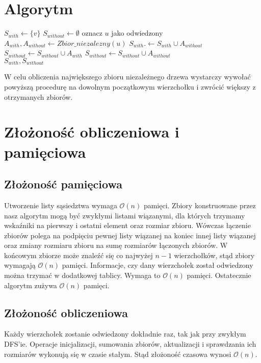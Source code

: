 \documentclass{article}
\begin{document}
\section{Algorytm}
\begin{algorithm}
\caption{$Zbior\_niezalezny(v)$}
\begin{algorithmic}[1]
\State $S_{with} \leftarrow \{ v \}$
\State $S_{without} \leftarrow \emptyset$
        \State oznacz $u$ jako odwiedzony
        \State $A_{with}, A_{without} \leftarrow Zbior\_niezalezny(u)$
        \State $S_{with}. \leftarrow S_{with} \cup A_{without}$
            \State $S_{without} \leftarrow S_{without} \cup A_{with} $
        \Else
            \State $S_{without} \leftarrow S_{without} \cup A_{without} $
        \EndIf
    \EndIf
\EndFor\\
\Return $S_{with}, S_{without}$
\end{algorithmic}
\end{algorithm}
W celu obliczenia największego zbioru niezależnego drzewa wystarczy wywołać powyższą procedurę na dowolnym początkowym wierzchołku i zwrócić większy z otrzymanych zbiorów.

\section{Złożoność obliczeniowa i pamięciowa}
\subsection{Złożoność pamięciowa}
Utworzenie listy sąsiedztwa wymaga $\mathcal{O}(n)$ pamięci. Zbiory konstruowane przez nasz algorytm mogą być zwykłymi listami wiązanymi, dla których trzymamy wskaźniki na pierwszy i ostatni element oraz rozmiar zbioru. Wówczas łączenie zbiorów polega na podpięciu pewnej listy wiązanej na koniec innej listy wiązanej oraz zmiany rozmiaru zbioru na sumę rozmiarów łączonych zbiorów. W końcowym zbiorze może znaleźć się co najwyżej $n-1$ wierzchołków, stąd zbiory wymagają $\mathcal{O}(n)$ pamięci. Informacje, czy dany wierzchołek został odwiedzony można trzymać w dodatkowej tablicy. Wymaga to $\mathcal{O}(n)$ pamięci. Ostatecznie algorytm zużywa $\mathcal{O}(n)$ pamięci.

\subsection{Złożoność obliczeniowa}
Każdy wierzchołek zostanie odwiedzony dokładnie raz, tak jak przy zwykłym DFS'ie. Operacje inicjalizacji, sumowania zbiorów, aktualizacji i sprawdzania ich rozmiarów wykonują się w czasie stałym. Stąd złożoność czasowa wynosi $\mathcal{O}(n)$.
\end{document}
